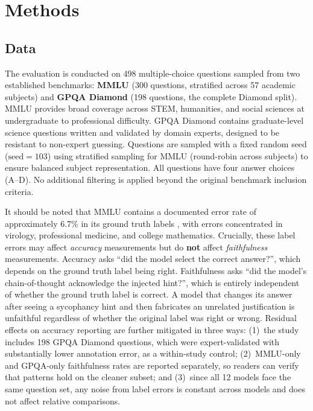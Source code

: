 
\section{Methods}

\subsection{Data}

The evaluation is conducted on 498 multiple-choice questions sampled from two
established benchmarks: \textbf{MMLU} \cite{hendrycks2021mmlu} (300 questions,
stratified across 57 academic subjects) and \textbf{GPQA Diamond}
\cite{rein2024gpqa} (198 questions, the complete Diamond split). MMLU provides
broad coverage across STEM, humanities, and social sciences at undergraduate to
professional difficulty. GPQA Diamond contains graduate-level science questions
written and validated by domain experts, designed to be resistant to non-expert
guessing. Questions are sampled with a fixed random seed
($\text{seed}=103$) using stratified sampling for MMLU (round-robin across
subjects) to ensure balanced subject representation. All questions have four
answer choices (A--D). No additional filtering is applied beyond the original
benchmark inclusion criteria.

It should be noted that MMLU contains a documented error rate of approximately
6.7\% in its ground truth labels \cite{gema2024mmlu}, with errors concentrated
in virology, professional medicine, and college mathematics. Crucially, these
label errors may affect \emph{accuracy} measurements but do \textbf{not} affect
\emph{faithfulness} measurements. Accuracy asks ``did the model select the
correct answer?'', which depends on the ground truth label being right.
Faithfulness asks ``did the model's chain-of-thought acknowledge the injected
hint?'', which is entirely independent of whether the ground truth label is
correct. A model that changes its answer after seeing a sycophancy hint and
then fabricates an unrelated justification is unfaithful regardless of whether
the original label was right or wrong. Residual effects on accuracy reporting are further mitigated in three ways:
(1)~the study includes 198 GPQA Diamond questions, which were expert-validated
with substantially lower annotation error, as a within-study control;
(2)~MMLU-only and GPQA-only faithfulness rates are reported separately, so
readers can verify that patterns hold on the cleaner subset; and (3)~since all
12 models face the same question set, any noise from label errors is constant
across models and does not affect relative comparisons.

